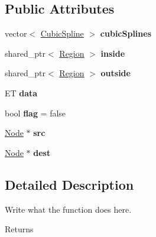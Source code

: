 \subsection*{Public Attributes}
\begin{DoxyCompactItemize}
\item 
\hypertarget{structEdge_a3e6e9829abcffa41c78a09de513e2734}{vector$<$ \hyperlink{structCubicSpline}{Cubic\+Spline} $>$ {\bfseries cubic\+Splines}}\label{structEdge_a3e6e9829abcffa41c78a09de513e2734}

\item 
\hypertarget{structEdge_a8fe1ad8fd85914e617fb6084440fd863}{shared\+\_\+ptr$<$ \hyperlink{structRegion}{Region} $>$ {\bfseries inside}}\label{structEdge_a8fe1ad8fd85914e617fb6084440fd863}

\item 
\hypertarget{structEdge_a827600852145737ed547bb3fd75c7c47}{shared\+\_\+ptr$<$ \hyperlink{structRegion}{Region} $>$ {\bfseries outside}}\label{structEdge_a827600852145737ed547bb3fd75c7c47}

\item 
\hypertarget{structEdge_a6f7d1d8a2f2919f085e9bf96c57e1119}{E\+T {\bfseries data}}\label{structEdge_a6f7d1d8a2f2919f085e9bf96c57e1119}

\item 
\hypertarget{structEdge_a76d10f80be295bbdb4ff0a55839c31b0}{bool {\bfseries flag} = false}\label{structEdge_a76d10f80be295bbdb4ff0a55839c31b0}

\item 
\hypertarget{structEdge_a56a084878bcf2b8e768494ec7a98620b}{\hyperlink{structNode}{Node} $\ast$ {\bfseries src}}\label{structEdge_a56a084878bcf2b8e768494ec7a98620b}

\item 
\hypertarget{structEdge_a70eb1c0683ec0a252fbeff0cdf7403ef}{\hyperlink{structNode}{Node} $\ast$ {\bfseries dest}}\label{structEdge_a70eb1c0683ec0a252fbeff0cdf7403ef}

\end{DoxyCompactItemize}


\subsection{Detailed Description}
Write what the function does here. 

\begin{DoxyReturn}{Returns}

\end{DoxyReturn}


